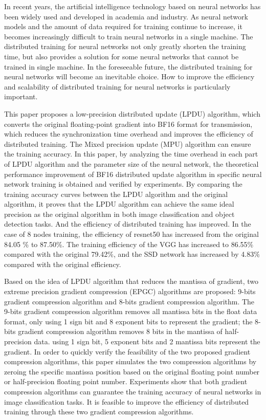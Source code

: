 \begin{eabstract}
In recent years, the artificial intelligence technology based on neural networks has been widely used and developed in academia and industry. As neural network models and the amount of data required for training continue to increase, it becomes increasingly difficult to train neural networks in a single machine. The distributed training for neural networks not only greatly shorten the training time, but also provides a solution for some neural networks that cannot be trained in single machine. In the foreseeable future, the distributed training for neural networks will become an inevitable choice. How to improve the efficiency and scalability of distributed training for neural networks is particularly important.

This paper proposes a low-precision distributed update (LPDU) algorithm, which converts the original floating-point gradient into BF16 format for transmission, which reduces the synchronization time overhead and improves the efficiency of distributed training. The Mixed precision update  (MPU) algorithm can ensure the training accuracy. In this paper, by analyzing the time overhead in each part of LPDU algorithm and the parameter size of the neural network, the theoretical performance improvement of BF16 distributed update algorithm in specific neural network training is obtained and verified by experiments. By comparing the training accuracy curves between the LPDU algorithm and the original algorithm, it proves that the LPDU algorithm can achieve the same ideal precision as the original algorithm in both image classification and object detection tasks. And the efficiency of distributed training has improved. In the case of 8 nodes training, the efficiency of resnet50 has increased from the original 84.05 \% to 87.50\%. The training efficiency of the VGG has increased to 86.55\% compared with the original 79.42\%, and the SSD network has increased by 4.83\% compared with the original efficiency.

Based on the idea of LPDU algorithm that reduces the mantissa of gradient, two extreme precision gradient compression (EPGC) algorithms are proposed: 9-bits gradient compression algorithm and 8-bits gradient compression algorithm. The 9-bits gradient compression algorithm removes all mantissa bits in the float data format, only using 1 sign bit and 8 exponent bits to represent the gradient; the 8-bits gradient compression algorithm removes 8 bits in the mantissa of half-precision data. using 1 sign bit, 5 exponent bits and 2 mantissa bits represent the gradient. In order to quickly verify the feasibility of the two proposed gradient compression algorithms, this paper simulates the two compression algorithms by zeroing the specific mantissa position based on the original floating point number or half-precision floating point number. Experiments show that both gradient compression algorithms can guarantee the training accuracy of neural networks in image classification tasks. It is feasible to improve the efficiency of distributed training through these two gradient compression algorithms.

\end{eabstract}

